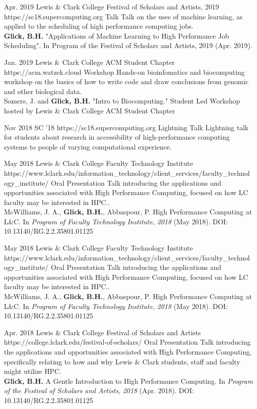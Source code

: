 \documentclass[10pt]{article} %
\begin{document}
\award
{Apr. 2019}
{}
{Lewis \& Clark College Festival of Scholars and Artists, 2019}
{https://sc18.supercomputing.org}
{Talk}
{Talk on the uses of machine learning, as applied to the scheduling of high performance computing jobs. \\  \textbf{Glick, B.H.} "Applications of Machine Learning to High Performance Job Scheduling". In Program of the Festival of Scholars and Artists, 2019 (Apr. 2019).}

\award
{Jan. 2019}
{ }
{Lewis \& Clark College ACM Student Chapter}
{https://acm.watzek.cloud}
{Workshop}
{Hands-on bioinfomatics and biocomputing workshop on the basics of how to write code and draw conclusions from genomic and other biological data. \\ Somers, J. and  \textbf{Glick, B.H.} "Intro to Biocomputing." Student Led Workshop hosted by Lewis \& Clark College ACM Student Chapter}

\award
{Nov 2018}
{ }
{SC '18}
{https://sc18.supercomputing.org}
{Lightning Talk}
{Lightning talk for students about research in accessibility of high-performance computing systems to people of varying computational experience.}


\award
{May 2018}
{ }
{Lewis \& Clark College Faculty Technology Institute}
{https://www.lclark.edu/information_technology/client_services/faculty_technology_institute/}
{Oral Presentation}
{Talk introducing the applications and opportunities associated with High Performance Computing, focused on how LC faculty may be interested in HPC..\\  McWilliams, J. A., \textbf{Glick, B.H.}, Abbaspour, P. High Performance Computing at L\&C. In \textit{Program of Faculty Technology Institute, 2018} (May 2018). DOI: 10.13140/RG.2.2.35801.01125}


\award
{May 2018}
{ }
{Lewis \& Clark College Faculty Technology Institute}
{https://www.lclark.edu/information_technology/client_services/faculty_technology_institute/}
{Oral Presentation}
{Talk introducing the applications and opportunities associated with High Performance Computing, focused on how LC faculty may be interested in HPC..\\  McWilliams, J. A., \textbf{Glick, B.H.}, Abbaspour, P. High Performance Computing at L\&C. In \textit{Program of Faculty Technology Institute, 2018} (May 2018). DOI: 10.13140/RG.2.2.35801.01125}

\award
{Apr. 2018}
{ }
{Lewis \& Clark College Festival of Scholars and Artists}
{https://college.lclark.edu/festival-of-scholars/}
{Oral Presentation}
{Talk introducing the applications and opportunities associated with High Performance Computing, specifically relating to how and why  Lewis \& Clark students, staff and faculty might utilize HPC.\\ \textbf{Glick, B.H.} A Gentle Introduction to High Performance Computing. In \textit{Program of the Festival of Scholars and Artists, 2018} (Apr. 2018). DOI: 10.13140/RG.2.2.35801.01125}
\end{document}

